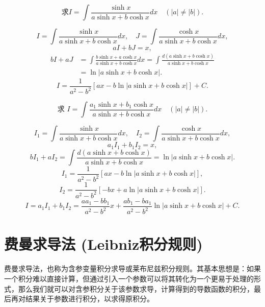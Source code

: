 \documentclass[lang=cn,newtx,10pt,scheme=chinese]{elegantbook}
\begin{document}
\begin{example}
  \begin{equation}
    \text{求} I = \int \frac{\sinh x}{a \sinh x + b \cosh x} dx \quad (|a| \ne |b|).
  \end{equation}
\end{example}
\begin{solution}
  $$
  I = \int \frac{\sinh x}{a \sinh x + b \cosh x} dx, \quad J = \int \frac{\cosh x}{a \sinh x + b \cosh x} dx,
  $$
  $$
  a I + b J = x,
  $$
  $$
  \begin{aligned}
  b I + a J &= \int \frac{b \sinh x + a \cosh x}{a \sinh x + b \cosh x} dx = \int \frac{d(a \sinh x + b \cosh x)}{a \sinh x + b \cosh x} \\
  &= \ln|a \sinh x + b \cosh x|.
  \end{aligned}
  $$
  $$
  I = \frac{1}{a^2 - b^2} [ax - b \ln|a \sinh x + b \cosh x|] + C.
  $$
\end{solution}

\begin{example}
  \begin{equation}
    \text{求 } I = \int \frac{a_1 \sinh x + b_1 \cosh x}{a \sinh x + b \cosh x} dx \quad (|a| \ne |b|).
  \end{equation}
\end{example}
\begin{solution}
  $$
  I_1 = \int \frac{\sinh x}{a \sinh x + b \cosh x} dx, \quad I_2 = \int \frac{\cosh x}{a \sinh x + b \cosh x} dx,
  $$
  $$
  a_1 I_1 + b_1 I_2 = x,
  $$
  $$
  b I_1 + a I_2 = \int \frac{d(a \sinh x + b \cosh x)}{a \sinh x + b \cosh x} = \ln|a \sinh x + b \cosh x|.
  $$
  $$
  I_1 = \frac{1}{a^2 - b^2} [ax - b \ln|a \sinh x + b \cosh x|],
  $$
  $$
  I_2 = \frac{1}{a^2 - b^2} [-bx + a \ln|a \sinh x + b \cosh x|].
  $$
  $$
  I = a_1 I_1 + b_1 I_2 = \frac{a a_1 - b b_1}{a^2 - b^2} x + \frac{a b_1 - b a_1}{a^2 - b^2} \ln|a \sinh x + b \cosh x| + C.
  $$
\end{solution}

\section{费曼求导法 (Leibniz积分规则)}
费曼求导法，也称为含参变量积分求导或莱布尼兹积分规则。其基本思想是：如果一个积分难以直接计算，但通过引入一个参数可以将其转化为一个更易于处理的形式，那么我们就可以对含参积分关于该参数求导，计算得到的导数函数的积分，最后再对结果关于参数进行积分，以求得原积分。
\end{document}
